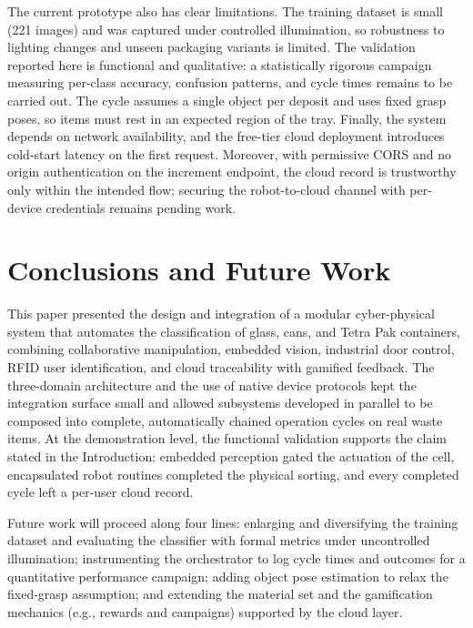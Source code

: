 \documentclass[conference]{IEEEtran}
\begin{document}
The current prototype also has clear limitations. The training dataset is small (221 images) and was captured under controlled illumination, so robustness to lighting changes and unseen packaging variants is limited. The validation reported here is functional and qualitative: a statistically rigorous campaign measuring per-class accuracy, confusion patterns, and cycle times remains to be carried out. The cycle assumes a single object per deposit and uses fixed grasp poses, so items must rest in an expected region of the tray. Finally, the system depends on network availability, and the free-tier cloud deployment introduces cold-start latency on the first request. Moreover, with permissive CORS and no origin authentication on the increment endpoint, the cloud record is trustworthy only within the intended flow; securing the robot-to-cloud channel with per-device credentials remains pending work.

\section{Conclusions and Future Work}
This paper presented the design and integration of a modular cyber-physical system that automates the classification of glass, cans, and Tetra Pak containers, combining collaborative manipulation, embedded vision, industrial door control, RFID user identification, and cloud traceability with gamified feedback. The three-domain architecture and the use of native device protocols kept the integration surface small and allowed subsystems developed in parallel to be composed into complete, automatically chained operation cycles on real waste items. At the demonstration level, the functional validation supports the claim stated in the Introduction: embedded perception gated the actuation of the cell, encapsulated robot routines completed the physical sorting, and every completed cycle left a per-user cloud record.

Future work will proceed along four lines: enlarging and diversifying the training dataset and evaluating the classifier with formal metrics under uncontrolled illumination; instrumenting the orchestrator to log cycle times and outcomes for a quantitative performance campaign; adding object pose estimation to relax the fixed-grasp assumption; and extending the material set and the gamification mechanics (e.g., rewards and campaigns) supported by the cloud layer.

\end{document}
